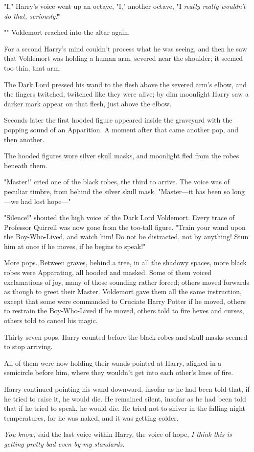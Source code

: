 "I," Harry's voice went up an octave, "I," another octave, "I \emph{really
really wouldn't do that, seriously!}"

"" Voldemort reached
into the altar again.

For a second Harry's mind couldn't process what he was seeing, and then he saw
that Voldemort was holding a human arm, severed near the shoulder; it seemed
too thin, that arm.

The Dark Lord pressed his wand to the flesh above the severed arm's elbow, and
the fingers twitched, twitched like they were alive; by dim moonlight Harry saw
a darker mark appear on that flesh, just above the elbow.

Seconds later the first hooded figure appeared inside the graveyard with the
popping sound of an Apparition. A moment after that came another pop, and then
another.

The hooded figures wore silver skull masks, and moonlight fled from the robes
beneath them.

"Master!" cried one of the black robes, the third to arrive. The voice was of
peculiar timbre, from behind the silver skull mask. "Master—it has been so
long—we had lost hope—"

"Silence!" shouted the high voice of the Dark Lord Voldemort. Every trace of
Professor Quirrell was now gone from the too-tall figure. "Train your wand upon
the Boy-Who-Lived, and watch him! Do not be distracted, not by anything! Stun
him at once if he moves, if he begins to speak!"

More pops. Between graves, behind a tree, in all the shadowy spaces, more black
robes were Apparating, all hooded and masked. Some of them voiced exclamations
of joy, many of those sounding rather forced; others moved forwards as though
to greet their Master. Voldemort gave them all the same instruction, except
that some were commanded to Cruciate Harry Potter if he moved, others to
restrain the Boy-Who-Lived if he moved, others told to fire hexes and curses,
others told to cancel his magic.

Thirty-seven pops, Harry counted before the black robes and skull masks seemed
to stop arriving.

All of them were now holding their wands pointed at Harry, aligned in a
semicircle before him, where they wouldn't get into each other's lines of fire.

Harry continued pointing his wand downward, insofar as he had been told that,
if he tried to raise it, he would die. He remained silent, insofar as he had
been told that if he tried to speak, he would die. He tried not to shiver in
the falling night temperatures, for he was naked, and it was getting colder.

\emph{You know,} said the last voice within Harry, the voice of hope, \emph{I
think this is getting pretty bad even by my standards.}
